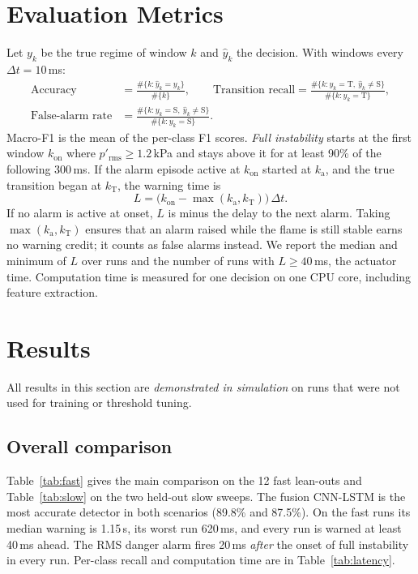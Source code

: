 \documentclass[11pt,a4paper]{article}
\begin{document}
\section{Evaluation Metrics}\label{sec:metrics}
Let $y_k$ be the true regime of window $k$ and $\hat y_k$ the decision. With windows every $\Delta t=10$\,ms:
\begin{align}
  \text{Accuracy} &= \frac{\#\{k:\hat y_k=y_k\}}{\#\{k\}}, \qquad
  \text{Transition recall} = \frac{\#\{k: y_k=\mathrm T,\ \hat y_k\ne \mathrm S\}}{\#\{k: y_k=\mathrm T\}},\\
  \text{False-alarm rate} &= \frac{\#\{k: y_k=\mathrm S,\ \hat y_k\ne \mathrm S\}}{\#\{k: y_k=\mathrm S\}} .
\end{align}
Macro-F1 is the mean of the per-class F1 scores. \emph{Full instability} starts at the first window $k_\mathrm{on}$ where $p'_\mathrm{rms}\ge1.2$\,kPa and stays above it for at least 90\% of the following 300\,ms. If the alarm episode active at $k_\mathrm{on}$ started at $k_\mathrm{a}$, and the true transition began at $k_\mathrm{T}$, the warning time is
\begin{equation}
  L = \big(k_\mathrm{on} - \max(k_\mathrm a, k_\mathrm T)\big)\,\Delta t .
\end{equation}
If no alarm is active at onset, $L$ is minus the delay to the next alarm. Taking $\max(k_\mathrm a,k_\mathrm T)$ ensures that an alarm raised while the flame is still stable earns no warning credit; it counts as false alarms instead. We report the median and minimum of $L$ over runs and the number of runs with $L\ge40$\,ms, the actuator time. Computation time is measured for one decision on one CPU core, including feature extraction.

\section{Results}\label{sec:results}
All results in this section are \emph{demonstrated in simulation} on runs that were not used for training or threshold tuning.

\subsection{Overall comparison}
Table~\ref{tab:fast} gives the main comparison on the 12 fast lean-outs and Table~\ref{tab:slow} on the two held-out slow sweeps. The fusion CNN-LSTM is the most accurate detector in both scenarios (89.8\% and 87.5\%). On the fast runs its median warning is 1.15\,s, its worst run 620\,ms, and every run is warned at least 40\,ms ahead. The RMS danger alarm fires 20\,ms \emph{after} the onset of full instability in every run. Per-class recall and computation time are in Table~\ref{tab:latency}.
\end{document}
